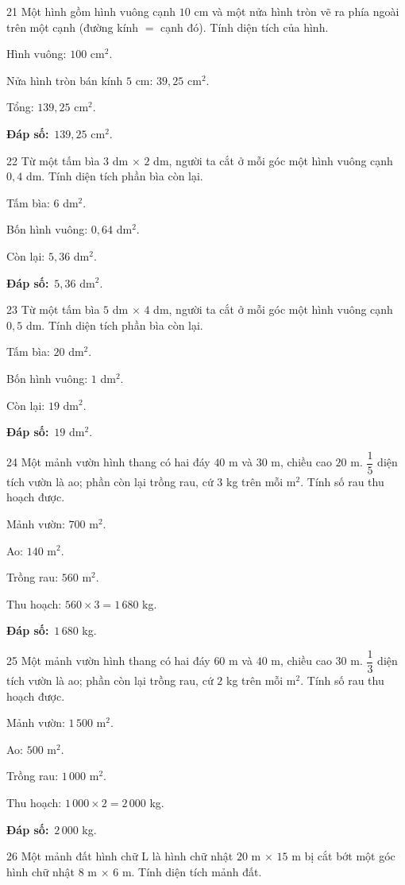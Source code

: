 \documentclass[11pt]{article}
\newif\ifsol \solfalse
\providecommand{\AnsWord}{Đáp số}
\newcommand{\dapso}[1]{\par\textbf{\AnsWord:}\ #1}
\newcommand{\probsol}[1]{%
  \begin{lrbox}{\solmeasure}\begin{minipage}{\dimexpr\linewidth-24pt\relax}#1\end{minipage}\end{lrbox}%
  \ifsol
    \begin{solbox}#1\end{solbox}%
  \else
    \setlength{\solht}{\dimexpr\ht\solmeasure+\dp\solmeasure+0.85cm\relax}%
    \ifdim\solht<1.35cm\setlength{\solht}{1.35cm}\fi
    \begin{tcolorbox}[colback=white,colframe=Line,boxrule=0.8pt,arc=5pt,
      left=8pt,right=8pt,top=4pt,bottom=4pt,height=\solht]{\footnotesize\color{Slate}\itshape\WorkWord}\end{tcolorbox}%
  \fi}
\newcommand{\gap}{\vspace{0.3cm}}
\def\WorkWord{Bài làm:}
\def\AnsWord{Đáp số}
\begin{document}
\gap
\begin{probbox}{21}{\relax}
Một hình gồm hình vuông cạnh $10$ cm và một nửa hình tròn vẽ ra phía ngoài trên một cạnh (đường kính $=$ cạnh đó). Tính diện tích của hình.
\end{probbox}
\probsol{
Hình vuông: $100$ cm$^2$.\par Nửa hình tròn bán kính $5$ cm: $39{,}25$ cm$^2$.\par Tổng: $139{,}25$ cm$^2$.
\dapso{$139{,}25$ cm$^2$.}}
\gap
\begin{probbox}{22}{\relax}
Từ một tấm bìa $3$ dm $\times$ $2$ dm, người ta cắt ở mỗi góc một hình vuông cạnh $0{,}4$ dm. Tính diện tích phần bìa còn lại.
\end{probbox}
\probsol{
Tấm bìa: $6$ dm$^2$.\par Bốn hình vuông: $0{,}64$ dm$^2$.\par Còn lại: $5{,}36$ dm$^2$.
\dapso{$5{,}36$ dm$^2$.}}
\gap
\begin{probbox}{23}{\relax}
Từ một tấm bìa $5$ dm $\times$ $4$ dm, người ta cắt ở mỗi góc một hình vuông cạnh $0{,}5$ dm. Tính diện tích phần bìa còn lại.
\end{probbox}
\probsol{
Tấm bìa: $20$ dm$^2$.\par Bốn hình vuông: $1$ dm$^2$.\par Còn lại: $19$ dm$^2$.
\dapso{$19$ dm$^2$.}}
\gap
\begin{probbox}{24}{\relax}
Một mảnh vườn hình thang có hai đáy $40$ m và $30$ m, chiều cao $20$ m. $\dfrac{1}{5}$ diện tích vườn là ao; phần còn lại trồng rau, cứ $3$ kg trên mỗi m$^2$. Tính số rau thu hoạch được.
\end{probbox}
\probsol{
Mảnh vườn: $700$ m$^2$.\par Ao: $140$ m$^2$.\par Trồng rau: $560$ m$^2$.\par Thu hoạch: $560\times3=1\,680$ kg.
\dapso{$1\,680$ kg.}}
\gap
\begin{probbox}{25}{\relax}
Một mảnh vườn hình thang có hai đáy $60$ m và $40$ m, chiều cao $30$ m. $\dfrac{1}{3}$ diện tích vườn là ao; phần còn lại trồng rau, cứ $2$ kg trên mỗi m$^2$. Tính số rau thu hoạch được.
\end{probbox}
\probsol{
Mảnh vườn: $1\,500$ m$^2$.\par Ao: $500$ m$^2$.\par Trồng rau: $1\,000$ m$^2$.\par Thu hoạch: $1\,000\times2=2\,000$ kg.
\dapso{$2\,000$ kg.}}
\gap
\begin{probbox}{26}{\relax}
Một mảnh đất hình chữ L là hình chữ nhật $20$ m $\times$ $15$ m bị cắt bớt một góc hình chữ nhật $8$ m $\times$ $6$ m. Tính diện tích mảnh đất.
\end{probbox}
\end{document}

